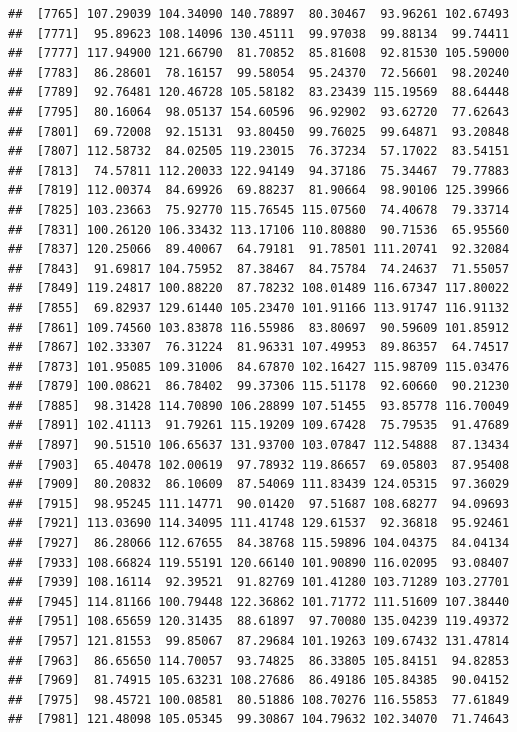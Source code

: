 \documentclass[
]{article}
\begin{document}
\begin{verbatim}
##  [7765] 107.29039 104.34090 140.78897  80.30467  93.96261 102.67493
##  [7771]  95.89623 108.14096 130.45111  99.97038  99.88134  99.74411
##  [7777] 117.94900 121.66790  81.70852  85.81608  92.81530 105.59000
##  [7783]  86.28601  78.16157  99.58054  95.24370  72.56601  98.20240
##  [7789]  92.76481 120.46728 105.58182  83.23439 115.19569  88.64448
##  [7795]  80.16064  98.05137 154.60596  96.92902  93.62720  77.62643
##  [7801]  69.72008  92.15131  93.80450  99.76025  99.64871  93.20848
##  [7807] 112.58732  84.02505 119.23015  76.37234  57.17022  83.54151
##  [7813]  74.57811 112.20033 122.94149  94.37186  75.34467  79.77883
##  [7819] 112.00374  84.69926  69.88237  81.90664  98.90106 125.39966
##  [7825] 103.23663  75.92770 115.76545 115.07560  74.40678  79.33714
##  [7831] 100.26120 106.33432 113.17106 110.80880  90.71536  65.95560
##  [7837] 120.25066  89.40067  64.79181  91.78501 111.20741  92.32084
##  [7843]  91.69817 104.75952  87.38467  84.75784  74.24637  71.55057
##  [7849] 119.24817 100.88220  87.78232 108.01489 116.67347 117.80022
##  [7855]  69.82937 129.61440 105.23470 101.91166 113.91747 116.91132
##  [7861] 109.74560 103.83878 116.55986  83.80697  90.59609 101.85912
##  [7867] 102.33307  76.31224  81.96331 107.49953  89.86357  64.74517
##  [7873] 101.95085 109.31006  84.67870 102.16427 115.98709 115.03476
##  [7879] 100.08621  86.78402  99.37306 115.51178  92.60660  90.21230
##  [7885]  98.31428 114.70890 106.28899 107.51455  93.85778 116.70049
##  [7891] 102.41113  91.79261 115.19209 109.67428  75.79535  91.47689
##  [7897]  90.51510 106.65637 131.93700 103.07847 112.54888  87.13434
##  [7903]  65.40478 102.00619  97.78932 119.86657  69.05803  87.95408
##  [7909]  80.20832  86.10609  87.54069 111.83439 124.05315  97.36029
##  [7915]  98.95245 111.14771  90.01420  97.51687 108.68277  94.09693
##  [7921] 113.03690 114.34095 111.41748 129.61537  92.36818  95.92461
##  [7927]  86.28066 112.67655  84.38768 115.59896 104.04375  84.04134
##  [7933] 108.66824 119.55191 120.66140 101.90890 116.02095  93.08407
##  [7939] 108.16114  92.39521  91.82769 101.41280 103.71289 103.27701
##  [7945] 114.81166 100.79448 122.36862 101.71772 111.51609 107.38440
##  [7951] 108.65659 120.31435  88.61897  97.70080 135.04239 119.49372
##  [7957] 121.81553  99.85067  87.29684 101.19263 109.67432 131.47814
##  [7963]  86.65650 114.70057  93.74825  86.33805 105.84151  94.82853
##  [7969]  81.74915 105.63231 108.27686  86.49186 105.84385  90.04152
##  [7975]  98.45721 100.08581  80.51886 108.70276 116.55853  77.61849
##  [7981] 121.48098 105.05345  99.30867 104.79632 102.34070  71.74643

\end{verbatim}
\end{document}

